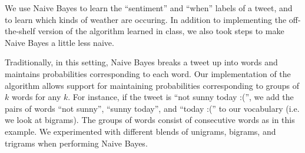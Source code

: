 	We use Naive Bayes to learn the ``sentiment'' and ``when'' labels of a tweet, and to learn which kinds of weather are occuring. In addition to implementing the off-the-shelf version of the algorithm learned in class, we also took steps to make Naive Bayes a little less naive.
	
	Traditionally, in this setting, Naive Bayes breaks a tweet up into words and maintains probabilities corresponding to each word. Our implementation of the algorithm allows support for maintaining probabilities corresponding to groups of $k$ words for any $k$. For instance, if the tweet is ``not sunny today :('', we add the pairs of words ``not sunny'', ``sunny today'', and ``today :('' to our vocabulary (i.e. we look at bigrams). The groups of words consist of consecutive words as in this example. We experimented with different blends of unigrams, bigrams, and trigrams when performing Naive Bayes.
